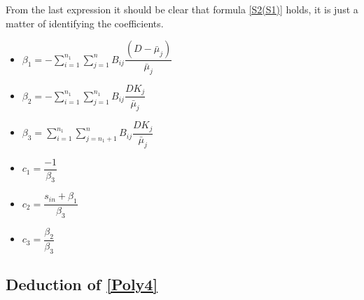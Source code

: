 \documentclass[3p,times]{elsarticle}
\begin{document}
From the last expression it should be clear that formula \eqref{S2(S1)} holds, it is just a matter of identifying the coefficients.
\begin{itemize}
	\item $\beta_1 =  - \sum \limits_{i=1}^{n_1} \sum \limits_{j = 1}^{n} B_{ij}\dfrac{(D-\bar{\mu}_j)}{\bar{\mu}_{j}}$
	\item $\beta_2 =-\sum \limits_{i=1}^{n_1}  \sum \limits_{j = 1}^{n_1} B_{ij}\dfrac{DK_j}{\bar{\mu}_{j}}$
	\item $\beta_3 = \sum \limits_{i=1}^{n_1}\sum \limits_{j = n_1+1}^{n} B_{ij}\dfrac{DK_j}{\bar{\mu}_{j}} $
	\item $c_1 = \dfrac{-1}{\beta_3}$
	\item $c_2 =  \dfrac{s_{in} + \beta_1}{\beta_3}$
	\item $c_3 = \dfrac{\beta_2}{\beta_3}$
\end{itemize}

\subsection{Deduction of \eqref{Poly4}}
\end{document}
